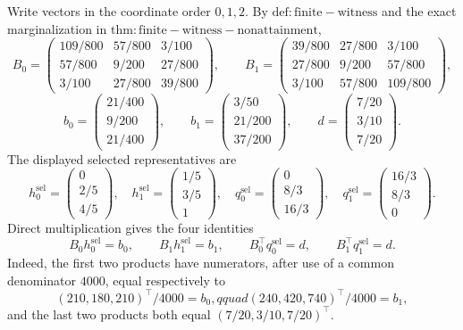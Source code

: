 Write vectors in the coordinate order \(0,1,2\).  By \(\mathrm{def:finite-witness}\) and the exact marginalization in \(\mathrm{thm:finite-witness-nonattainment}\),
\[
B_0=\begin{pmatrix}
109/800&57/800&3/100\\
57/800&9/200&27/800\\
3/100&27/800&39/800
\end{pmatrix},\qquad
B_1=\begin{pmatrix}
39/800&27/800&3/100\\
27/800&9/200&57/800\\
3/100&57/800&109/800
\end{pmatrix},
\]
\[
b_0=\begin{pmatrix}21/400\\9/200\\21/400\end{pmatrix},\qquad
b_1=\begin{pmatrix}3/50\\21/200\\37/200\end{pmatrix},\qquad
d=\begin{pmatrix}7/20\\3/10\\7/20\end{pmatrix}.
\]
The displayed selected representatives are
\[
h_0^{\mathrm{sel}}=\begin{pmatrix}0\\2/5\\4/5\end{pmatrix},\quad
h_1^{\mathrm{sel}}=\begin{pmatrix}1/5\\3/5\\1\end{pmatrix},\quad
q_0^{\mathrm{sel}}=\begin{pmatrix}0\\8/3\\16/3\end{pmatrix},\quad
q_1^{\mathrm{sel}}=\begin{pmatrix}16/3\\8/3\\0\end{pmatrix}.
\]
Direct multiplication gives the four identities
\[
B_0h_0^{\mathrm{sel}}=b_0,\qquad
B_1h_1^{\mathrm{sel}}=b_1,
\qquad
B_0^\top q_0^{\mathrm{sel}}=d,\qquad
B_1^\top q_1^{\mathrm{sel}}=d.
\]
Indeed, the first two products have numerators, after use of a common denominator \(4000\), equal respectively to
\[
(210,180,210)^\top/4000=b_0,qquad
(240,420,740)^\top/4000=b_1,
\]
and the last two products both equal \((7/20,3/10,7/20)^\top\).


